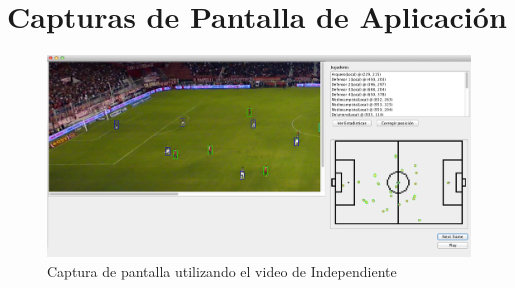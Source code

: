 \appendix
\section{Capturas de Pantalla de Aplicación}

\begin{figure}[H]
  \centering
  \includegraphics[width=\linewidth]{./images/Screen-Indep.png}
  \caption{Captura de pantalla utilizando el video de Independiente}
\end{figure}
